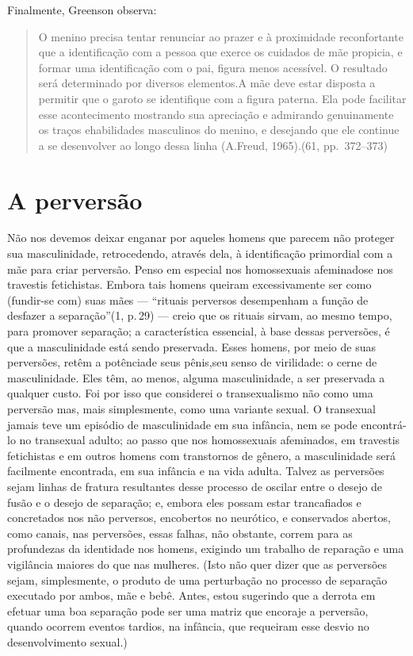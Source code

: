 Finalmente, Greenson observa:

\begin{quote}
O menino precisa tentar renunciar ao prazer e à proximidade
reconfortante que a identificação com a pessoa que exerce os cuidados
de mãe propicia, e formar uma identificação com o pai, figura menos
acessível. O resultado será determinado por diversos elementos.\idxhomosneur[|)] A mãe
deve estar disposta a permitir que o garoto se identifique com a figura
paterna. Ela pode facilitar esse acontecimento mostrando sua apreciação
e admirando genuinamente os traços e\idxangusimb[|)] habilidades masculinos do menino,
e desejando que ele continue a se desenvolver ao longo dessa linha (A.\idxangus[|)]
Freud,\idxannaf{} 1965).\idxgrens[|)] (61, pp.~372--373)
\end{quote}

\section{A perversão}

Não nos devemos deixar enganar por aqueles homens que parecem não
proteger sua\idxtravemmasc{} masculinidade,\idxmascutra{} retrocedendo, através dela, à identificação
primordial com a mãe para criar perversão. Penso em especial nos
homossexuais afeminados\idxhomosafem[|(] e nos travestis fetichistas. Embora tais homens
queiram excessivamente ser como (fundir-se com) suas mães ---
``rituais perversos desempenham a função de desfazer\idxdesfa{} a
separação''\idxpervproce[|(] (1, p.\,29) --- creio que os rituais sirvam,
ao mesmo tempo, para promover separação; a característica essencial, à
base dessas perversões, é que a masculinidade está sendo preservada.
Esses homens, por meio de suas perversões, retêm a potência\idxtravempote[|(] de seus
pênis,\idxpenisfant[|(] seu senso de virilidade: o cerne de masculinidade. Eles têm, ao
menos, alguma masculinidade, a ser preservada a qualquer custo. Foi por
isso que considerei o transexualismo não como uma perversão mas, mais
simplesmente, como uma variante sexual. O transexual jamais teve um
episódio de masculinidade em sua infância, nem se pode encontrá-lo no
transexual adulto; ao passo que nos homossexuais afeminados, em
travestis fetichistas e em outros homens com transtornos de gênero, a
masculinidade será facilmente encontrada, em sua infância e na vida
adulta. Talvez as perversões sejam linhas de fratura resultantes desse
processo de oscilar entre o desejo de fusão e o desejo de separação; e,
embora eles possam estar trancafiados e concretados nos não perversos,
encobertos no neurótico, e conservados abertos, como canais, nas
perversões, essas falhas, não obstante, correm para as profundezas da
identidade nos homens, exigindo um trabalho de reparação e uma
vigilância maiores do que nas mulheres. (Isto não quer dizer que as
perversões sejam, simplesmente, o produto de uma perturbação no
processo de separação executado por ambos, mãe e bebê. Antes, estou
sugerindo que a derrota em efetuar uma boa separação pode ser uma
matriz que encoraje a perversão, quando ocorrem eventos tardios, na
infância, que requeiram esse desvio no desenvolvimento sexual.)

